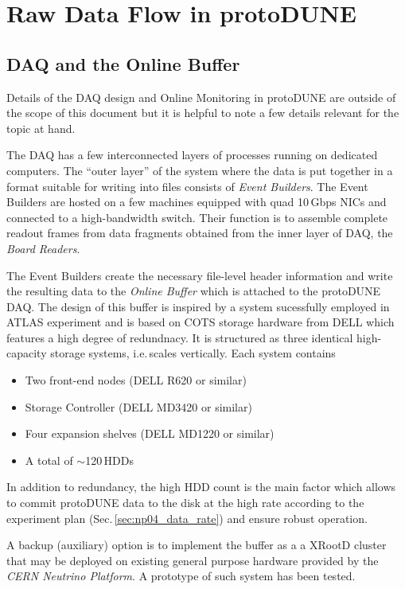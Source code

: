 \documentclass[a4paper]{jpconf}
\newcommand{\pd}{protoDUNE\xspace}
\begin{document}
\section{Raw Data Flow in \pd}
\label{sec:raw_concept}
\subsection{DAQ and the Online Buffer}
Details of the DAQ design and Online Monitoring in \pd are outside of the scope
of this document but it is helpful to note a few details relevant for the topic at hand.

The DAQ has a few interconnected layers of processes running on dedicated computers.
The ``outer layer'' of the system where the data is put together in a format
suitable for writing into files consists of  \textit{Event Builders}. The Event Builders
are hosted on a few machines equipped with quad 10\,Gbps NICs and connected to a high-bandwidth switch.
Their function is to assemble complete readout frames from data
fragments obtained from the inner layer of DAQ, the \textit{Board Readers}.

The Event Builders create the necessary file-level header information and write the
resulting data  to the \textit{Online Buffer} which is attached to the \pd DAQ. 
The design of this buffer is inspired by a system sucessfully employed in ATLAS experiment
and is based on COTS storage hardware from DELL which features a high degree of redundnacy.
It is structured as three identical high-capacity storage systems, i.e.\,scales vertically.
Each system contains
\begin{itemize}

\item Two front-end nodes (DELL R620 or similar)
\item Storage Controller (DELL MD3420 or similar)
\item Four expansion shelves (DELL MD1220 or similar)
\item A total of $\sim$120\,HDDs
\end{itemize}

\noindent In addition to redundancy, the high HDD count is the main factor which allows
to commit \pd data to the disk at the high rate according to the experiment plan
(Sec.\,\ref{sec:np04_data_rate}) and ensure robust operation.


A backup (auxiliary) option is to implement the buffer as a a XRootD \cite{xrootd} cluster
that may be deployed on existing general purpose hardware provided by the \textit{CERN
Neutrino Platform}\cite{cenf}.
A prototype of such system has been tested.
\end{document}
